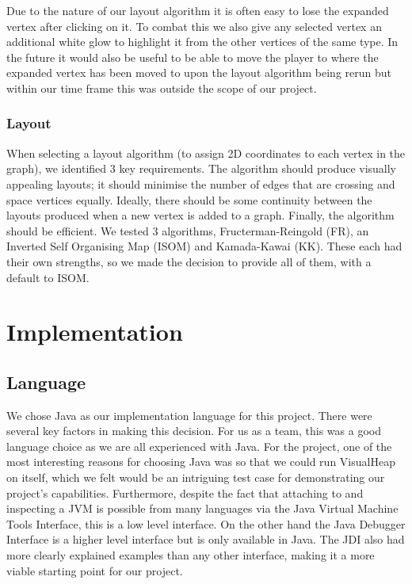 \documentclass[11pt, a4paper]{report}
\begin{document}
Due to the nature of our layout algorithm it is often easy to lose the expanded vertex after clicking on it. To combat this we also give any selected vertex an additional white glow to highlight it from the other vertices of the same type. In the future it would also be useful to be able to move the player to where the expanded vertex has been moved to upon the layout algorithm being rerun but within our time frame this was outside the scope of our project.

\subsection{Layout}

When selecting a layout algorithm (to assign 2D coordinates to each vertex in the graph), we identified 3 key requirements. The algorithm should produce visually appealing layouts; it should minimise the number of edges that are crossing and space vertices equally. Ideally, there should be some continuity between the layouts produced when a new vertex is added to a graph. Finally, the algorithm should be efficient. We tested 3 algorithms, Fructerman-Reingold (FR), an Inverted Self Organising Map (ISOM) and Kamada-Kawai (KK). These each had their own strengths, so we made the decision to provide all of them, with a default to ISOM.

\chapter{Implementation}

\section{Language}

We chose Java as our implementation language for this project. There were several key factors in making this decision. For us as a team, this was a good language choice as we are all experienced with Java. For the project, one of the most interesting reasons for choosing Java was so that we could run VisualHeap on itself, which we felt would be an intriguing test case for demonstrating our project’s capabilities. Furthermore, despite the fact that attaching to and inspecting a JVM is possible from many languages via the Java Virtual Machine Tools Interface, this is a low level interface. On the other hand the Java Debugger Interface is a higher level interface but is only available in Java. The JDI also had more clearly explained examples than any other interface, making it a more viable starting point for our project.
\end{document}
